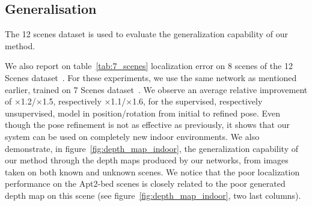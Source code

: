 \subsection{Generalisation} 

The 12 scenes dataset is used to evaluate the generalization capability of our method. 

We also report on table~\ref{tab:7_scenes} localization error on 8 scenes of the 12 Scenes dataset~\citep{Valentin2016}. For these experiments, we use the same network as mentioned earlier, trained on 7 Scenes dataset~\citep{Shotton2013}. We observe an average relative improvement of $\times$1.2/$\times$1.5, respectively $\times$1.1/$\times$1.6, for the supervised, respectively unsupervised, model in position/rotation from initial to refined pose. Even though the pose refinement is not as effective as previously, it shows that our system can be used on completely new indoor environments. We also demonstrate, in figure~\ref{fig:depth_map_indoor}, the generalization capability of our method through the depth maps produced by our networks, from images taken on both known and unknown scenes. We notice that the poor localization performance on the Apt2-bed scenes is closely related to the poor generated depth map on this scene (see figure~\ref{fig:depth_map_indoor}, two last columns).
